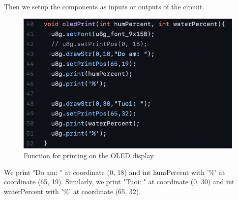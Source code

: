 \documentclass[12pt]{article}
\begin{document}
    Then we setup the components as inputs or outputs of the circuit.
    
    \begin{figure}[H]
        \centering
        \includegraphics{./images/OLED_print.png}
        \caption{Function for printing on the OLED display}
        \label{fig:OLED_print}
    \end{figure}
    
    We print "Do am: " at coordinate (0, 18) and int humPercent with '\%' at coordinate (65, 19). Similarly, we print "Tuoi: " at coordinate (0, 30) and int waterPercent with '\%' at coordinate (65, 32).
\end{document}
